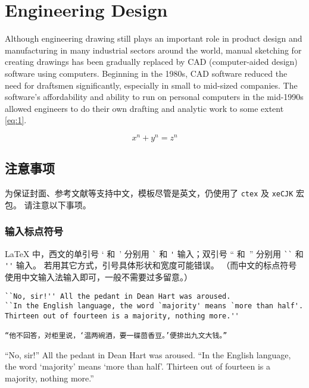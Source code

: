 \chapter{Engineering Design}

Although engineering drawing still plays an important role in product design and manufacturing in many industrial sectors around the world, manual sketching for creating drawings has been gradually replaced by CAD (computer-aided design) software using computers. Beginning in the 1980s, CAD software reduced the need for draftsmen significantly, especially in small to mid-sized companies. The software's affordability and ability to run on personal computers in the mid-1990s allowed engineers to do their own drafting and analytic work to some extent \ref{eq:1}.

\begin{equation}
x^n + y^n = z^n
\label{eq:1}
\end{equation}

\section{注意事项}

为保证封面、参考文献等支持中文，模板尽管是英文，仍使用了 \texttt{ctex} 及 \texttt{xeCJK} 宏包。
请注意以下事项。

\subsection{输入标点符号}


\LaTeX{} 中，西文的单引号 ` 和\ ' 分别用 \verb|`| 和 \verb|'| 输入；双引号 `` 和\ '' 分别用 \verb|``| 和 \verb|''| 输入。
若用其它方式，引号具体形状和宽度可能错误。
（而中文的标点符号使用中文输入法输入即可，一般不需要过多留意。）

\begin{lstlisting}
``No, sir!'' All the pedant in Dean Hart was aroused.
``In the English language, the word `majority' means `more than half'.
Thirteen out of fourteen is a majority, nothing more.''

“他不回答，对柜里说，‘温两碗酒，要一碟茴香豆。’便排出九文大钱。”
\end{lstlisting}

``No, sir!'' All the pedant in Dean Hart was aroused. ``In the English language, the word `majority' means `more than half'. Thirteen out of fourteen is a majority, nothing more.''

